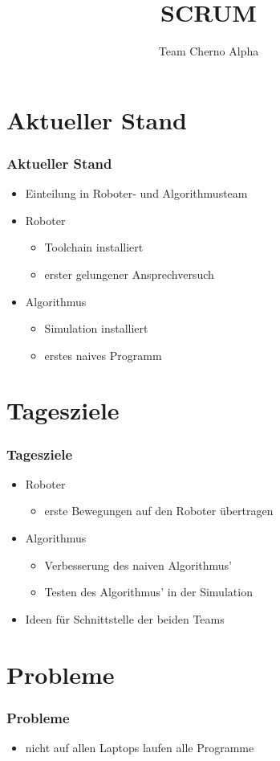 \documentclass[ddcfooter]{tudbeamer}
\begin{document}
\title{SCRUM}
\author{Team Cherno Alpha}
\maketitle

\section{Aktueller Stand}
\begin{frame}
\frametitle{Aktueller Stand}
\begin{itemize}
\item Einteilung in Roboter- und Algorithmusteam
\item Roboter
\begin{itemize}
\item Toolchain installiert
\item erster gelungener Ansprechversuch
\end{itemize}
\item Algorithmus
\begin{itemize}
\item Simulation installiert
\item erstes naives Programm
\end{itemize}
\end{itemize}
\end{frame}

\section{Tagesziele}
\begin{frame}
\frametitle{Tagesziele}
\begin{itemize}
\item Roboter
\begin{itemize}
\item erste Bewegungen auf den Roboter übertragen
\end{itemize}
\item Algorithmus
\begin{itemize}
\item Verbesserung des naiven Algorithmus'
\item Testen des Algorithmus' in der Simulation
\end{itemize}
\item Ideen für Schnittstelle der beiden Teams
\end{itemize}
\end{frame}

\section{Probleme}
\begin{frame}
\frametitle{Probleme}
\begin{itemize}
\item nicht auf allen Laptops laufen alle Programme
\end{itemize}
\end{frame}
\end{document}
